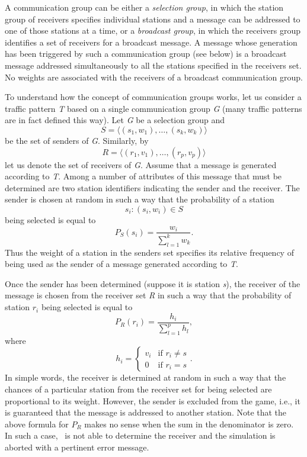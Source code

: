 A communication group can be either a {\em selection group}, in which
the station group of receivers specifies individual stations and
a message can be addressed to one of those stations at a time, or a
{\em broadcast group}, in which the receivers group identifies a set
of receivers for a broadcast message.
A message whose generation has been triggered by such
a communication group (see below) is a broadcast
message addressed simultaneously
to all the stations specified in the receivers set.
No weights are associated with the receivers of a broadcast communication
group.

To understand how the concept of communication groups
works, let us consider
a traffic pattern {\em T\/} based on a single communication
group {\em G\/} (many traffic patterns are in fact defined this way).
Let {\em G\/} be a selection group and
\[
S = \langle (s_1, w_1), \ldots ,(s_k, w_k) \rangle
\]
be the set of senders of {\em G}.
Similarly, by
\[
R = \langle (r_1, v_1) , \ldots ,(r_p, v_p) \rangle
\]
let us denote the set of receivers of {\em G}.
Assume that a message is generated according to {\em T}.
Among a number of attributes of this message that must be determined are
two station identifiers indicating the sender and the receiver.
The sender is chosen at random in such a way that the probability of a
station
\[
s_i: (s_i, w_i) \in S
\]
being selected is equal to
\[
P_S (s_i) = \frac{w_i}{\sum_{l=1}^k w_k}.
\]
Thus the weight of a station in the senders set specifies its relative
frequency of being used
as the sender of a message generated according to {\em T}.

Once the sender has been determined
(suppose it is station {\em s\/}),
the receiver of the message is chosen from
the receiver set {\em R\/} in such a way that the probability of
station $r_i$ being selected is equal to
\[
P_R (r_i) = \frac{h_i}{\sum_{l=1}^p h_l},
\]
where
\[
h_i = \left\{ \begin{array}{ll}
v_i & \mbox{if  $r_i \neq s$} \\
0   & \mbox{if  $r_i = s$}
\end{array}
      \right. .
\]
\noindent
In simple words, the receiver is determined at random in such a way that the
chances of a particular station from the receiver set for being selected
are proportional to its weight.
However, the sender is excluded from the game, i.e.,
it is guaranteed that the message is addressed to another station. Note that the
above formula for $P_R$ makes no sense when the sum in the denominator
is zero.
In such a case, \smurph\ is not able to determine the receiver and the
simulation is aborted with a pertinent error message.

